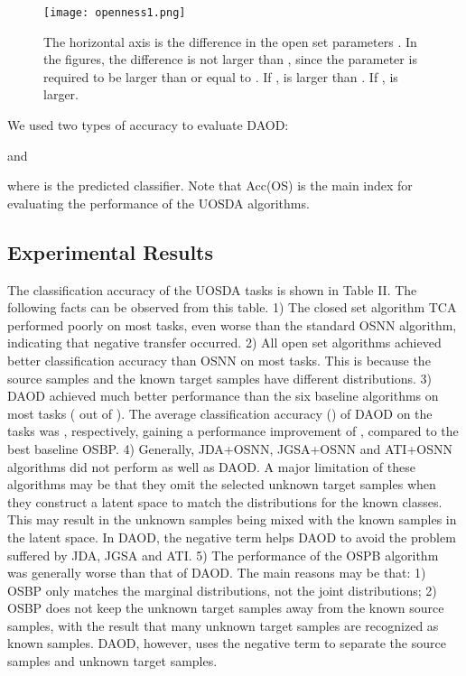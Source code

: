 \documentclass[journal]{IEEEtran}
\begin{document}
\begin{figure*}[t]
\centering
\texttt{[image: openness1.png]}
\caption{The horizontal axis is the difference in the open set parameters . In the figures, the difference  is not  larger than  , since the parameter  is required to be larger than or equal to . If ,  is larger than . If ,  is larger.}
\end{figure*}



We used two  types of accuracy \cite{DBLP:conf/iccv/BustoG17,DBLP:conf/eccv/SaitoYUH18} to evaluate DAOD:
\vspace{-0.cm}

and

where   is the predicted classifier. Note that Acc(OS) is the main index for evaluating the performance of the UOSDA algorithms\cite{DBLP:conf/iccv/BustoG17}.
\subsection{Experimental Results}
The classification accuracy of the UOSDA tasks is shown in Table II. The following facts can be observed from this table. 1) The closed set algorithm TCA performed poorly on most tasks, even worse than the standard OSNN algorithm, indicating that negative transfer occurred. 2) All open set algorithms achieved better classification accuracy than
OSNN on most tasks. This is because the source samples and the known target samples have different distributions. 3) DAOD achieved much better performance  than the six baseline algorithms on most tasks ( out of ). The average classification accuracy () of DAOD on the  tasks was ,  respectively, gaining a  performance improvement of ,  compared to the best baseline OSBP. 4) Generally, JDA+OSNN, JGSA+OSNN and ATI+OSNN algorithms did not perform as well as DAOD. A major limitation of these algorithms may be that they omit the selected unknown target samples when they construct a latent space to match the distributions for the known classes. This may result in the  unknown samples being mixed with the known samples in the latent space. In DAOD, the negative term  helps DAOD to avoid the problem suffered by JDA, JGSA and ATI. 5) The performance of the OSPB algorithm was generally worse than that of DAOD. The main reasons may be that: 1) OSBP only matches the marginal distributions, not the joint distributions; 2) OSBP does not keep the unknown target samples away from the known source samples, with the result that many unknown target samples are recognized as known samples. DAOD, however, uses the negative term  to separate the source samples and unknown target samples.
\end{document}
